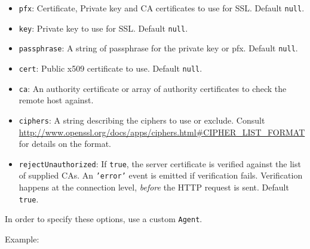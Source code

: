 \begin{itemize}
\item
  \texttt{pfx}: Certificate, Private key and CA certificates to use for
  SSL. Default \texttt{null}.
\item
  \texttt{key}: Private key to use for SSL. Default \texttt{null}.
\item
  \texttt{passphrase}: A string of passphrase for the private key or
  pfx. Default \texttt{null}.
\item
  \texttt{cert}: Public x509 certificate to use. Default \texttt{null}.
\item
  \texttt{ca}: An authority certificate or array of authority
  certificates to check the remote host against.
\item
  \texttt{ciphers}: A string describing the ciphers to use or exclude.
  Consult
  \url{http://www.openssl.org/docs/apps/ciphers.html#CIPHER_LIST_FORMAT}
  for details on the format.
\item
  \texttt{rejectUnauthorized}: If \texttt{true}, the server certificate
  is verified against the list of supplied CAs. An \texttt{'error'}
  event is emitted if verification fails. Verification happens at the
  connection level, \emph{before} the HTTP request is sent. Default
  \texttt{true}.
\end{itemize}

In order to specify these options, use a custom \texttt{Agent}.

Example:

\begin{Shaded}
\begin{Highlighting}[]
 
  \NormalTok{: }\NormalTok{,}
  \NormalTok{: }\NormalTok{,}
  \NormalTok{: }\NormalTok{,}
  \NormalTok{: }\NormalTok{,}
  \NormalTok{: }\NormalTok{(}\NormalTok{),}
  \NormalTok{: }\NormalTok{(}\NormalTok{)}
\NormalTok{\};}
 \NormalTok{= } 

 
\NormalTok{\}}
\end{Highlighting}
\end{Shaded}


